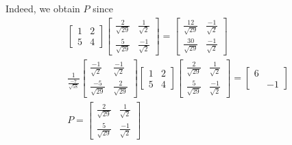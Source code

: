 \documentclass[twoside]{amsart}
\theoremstyle{plain}
\theoremstyle{definition}
\begin{document}
Indeed, we obtain $P$ since
\[
\begin{gathered}
  \left[ \begin{matrix} 1 & 2 \\ 5 & 4 \end{matrix} \right] \left[ \begin{matrix} \frac{2}{\sqrt{29} } & \frac{1}{\sqrt{2}} \\ \frac{5}{\sqrt{29}} & \frac{-1}{\sqrt{2}} \end{matrix} \right] = \left[ \begin{matrix} \frac{12}{\sqrt{29}} & \frac{-1}{\sqrt{2}} \\ \frac{30}{\sqrt{29}} & \frac{-1}{\sqrt{2}} \end{matrix} \right] \\
  \frac{1}{ \frac{-7 }{\sqrt{58}} } \left[ \begin{matrix} \frac{-1}{\sqrt{2}} & \frac{-1}{\sqrt{2}} \\ \frac{-5}{\sqrt{29}} & \frac{2}{\sqrt{29}} \end{matrix} \right] \left[ \begin{matrix} 1 & 2 \\ 5 & 4 \end{matrix} \right] \left[ \begin{matrix} \frac{2}{\sqrt{29}} & \frac{1}{\sqrt{2}} \\ \frac{5}{\sqrt{29}} & \frac{-1}{\sqrt{2}}\end{matrix} \right] = \left[ \begin{matrix} 6 & \\ & -1 \end{matrix} \right] \\
\boxed{ P = \left[ \begin{matrix} \frac{2}{\sqrt{29}} & \frac{1}{\sqrt{2}} \\ \frac{5}{\sqrt{29}}  & \frac{-1}{\sqrt{2}} \end{matrix} \right] }
\end{gathered}
\]
\end{document}

